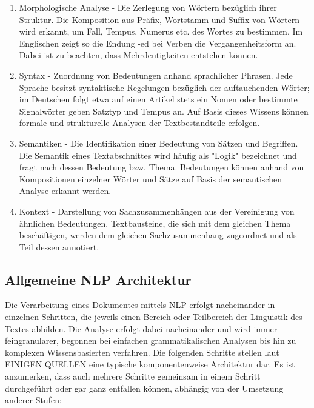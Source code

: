 \documentclass[12pt]{article}
\begin{document}
\begin{enumerate}
\item
Morphologische Analyse - Die Zerlegung von Wörtern bezüglich ihrer Struktur. Die Komposition aus Präfix, Wortstamm und Suffix von Wörtern wird erkannt, um Fall, Tempus, Numerus etc. des Wortes zu bestimmen. Im Englischen zeigt so die Endung -ed bei Verben die Vergangenheitsform an. Dabei ist zu beachten, dass Mehrdeutigkeiten entstehen können.
\item
Syntax - Zuordnung von Bedeutungen anhand sprachlicher Phrasen. Jede Sprache besitzt syntaktische Regelungen bezüglich der auftauchenden Wörter; im Deutschen folgt etwa auf einen Artikel stets ein Nomen oder bestimmte Signalwörter geben Satztyp und Tempus an. Auf Basis dieses Wissens können formale und strukturelle Analysen der Textbestandteile erfolgen.
\item
Semantiken - Die Identifikation einer Bedeutung von Sätzen und Begriffen. Die Semantik eines Textabschnittes wird häufig als "Logik" bezeichnet und fragt nach dessen Bedeutung bzw. Thema. Bedeutungen können anhand von Kompositionen einzelner Wörter und Sätze auf Basis der semantischen Analyse erkannt werden.
\item
Kontext - Darstellung von Sachzusammenhängen aus der Vereinigung von ähnlichen Bedeutungen. Textbausteine, die sich mit dem gleichen Thema beschäftigen, werden dem gleichen Sachzusammenhang zugeordnet und als Teil dessen annotiert.
\end{enumerate}

\subsection{Allgemeine NLP Architektur}
Die Verarbeitung eines Dokumentes mittels NLP erfolgt nacheinander in einzelnen Schritten, die jeweils einen Bereich oder Teilbereich der Linguistik des Textes abbilden. Die Analyse erfolgt dabei nacheinander und wird immer feingranularer, begonnen bei einfachen grammatikalischen Analysen bis hin zu komplexen Wissensbasierten verfahren. Die folgenden Schritte stellen laut EINIGEN QUELLEN eine typische komponentenweise Architektur dar. Es ist anzumerken, dass auch mehrere Schritte gemeinsam in einem Schritt durchgeführt oder gar ganz entfallen können, abhängig von der Umsetzung anderer Stufen:
\end{document}
